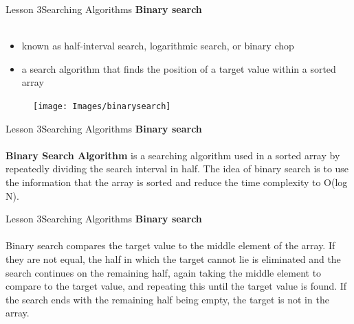 \documentclass[aspectratio=1610]{beamer}
\begin{document}

\begin{frame}{Lesson 3}{Searching Algorithms}
\LARGE
\textbf{Binary search}\\~\\
\begin{minipage}{0.65\textwidth}
\Large
\begin{itemize}
    \item known as half-interval search, logarithmic search, or binary chop
    \item a search algorithm that finds the position of a target value within a sorted array
 \end{itemize}
  \end{minipage}
\begin{minipage}{.0\textwidth}
      \begin{figure}
        \texttt{[image: Images/binarysearch]}
      \end{figure}
  \end{minipage}  
\end{frame}



\begin{frame}{Lesson 3}{Searching Algorithms}
\LARGE
\textbf{Binary search}\\~\\
\textbf{Binary Search Algorithm} is a searching algorithm used in a sorted array by
repeatedly dividing the search interval in half. The idea of binary search is to use the
information that the array is sorted and reduce the time complexity to O(log N). 
\end{frame}


\begin{frame}{Lesson 3}{Searching Algorithms}
\LARGE
\textbf{Binary search}\\~\\
Binary search compares the target value to the middle element of the array. If they are not equal, the half in which the target cannot lie is eliminated and the search continues on the remaining half, again taking the middle element to compare to the target value, and repeating this until the target value is found. If the search ends with the remaining half being empty, the target is not in the array.
\end{frame}
\end{document}
